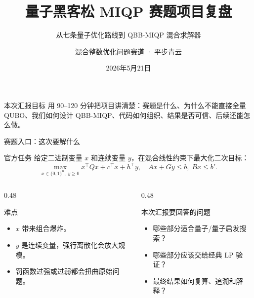 \documentclass[aspectratio=169]{beamer}
\title[QBB-MIQP 组会汇报]{量子黑客松 MIQP 赛题项目复盘}
\subtitle{从七条量子优化路线到 QBB-MIQP 混合求解器}
\author[平步青云]{混合整数优化问题赛道 · 平步青云}
\institute[Quantum MIQP]{Quantum Block-Benders for Mixed-Integer Quadratic Programming}
\date{2026年5月21日}
\begin{document}
\begin{frame}
  \titlepage
  \vspace{-6mm}
  \begin{alertblock}{本次汇报目标}
  \small 用 90--120 分钟把项目讲清楚：赛题是什么、为什么不能直接全量 QUBO、我们如何设计 QBB-MIQP、代码如何组织、结果是否可信、后续还能怎么做。
  \end{alertblock}
\end{frame}

\begin{frame}{赛题入口：这次要解什么}
\small
\begin{block}{官方任务}
给定二进制变量 $x$ 和连续变量 $y$，在混合线性约束下最大化二次目标：
\[
\max_{x\in\{0,1\}^n,\;y\ge 0}
x^\top Qx+c^\top x+h^\top y,
\quad
Ax+Gy\le b,\;Bx\le b'.
\]
\end{block}
\vspace{1mm}
\begin{columns}[T,onlytextwidth]
\begin{column}{0.48\textwidth}
\begin{alertblock}{难点}
\begin{itemize}
  \item $x$ 带来组合爆炸。
  \item $y$ 是连续变量，强行离散化会放大规模。
  \item 罚函数过强或过弱都会扭曲原始问题。
\end{itemize}
\end{alertblock}
\end{column}
\begin{column}{0.48\textwidth}
\begin{block}{本次汇报要回答的问题}
\begin{itemize}
  \item 哪些部分适合量子/量子启发搜索？
  \item 哪些部分应该交给经典 LP 验证？
  \item 最终结果如何复算、追溯和解释？
\end{itemize}
\end{block}
\end{column}
\end{columns}
\end{frame}
\end{document}
